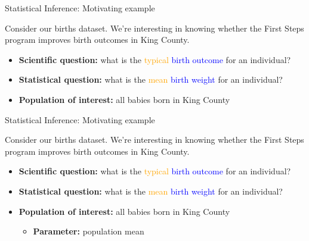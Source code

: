 \documentclass[10pt,t]{beamer}
\begin{document}
\begin{frame}{Statistical Inference: Motivating example}

Consider our births dataset. We're interesting in knowing whether the First Steps program improves birth outcomes in King County.

\vspace{0.1cm}

\begin{itemize}
	\item \textbf{Scientific question:} what is the \textcolor{orange}{typical}  \textcolor{blue}{birth outcome} for an individual?
	\item \textbf{Statistical question:} what is the \textcolor{orange}{mean} \textcolor{blue}{birth weight} for an individual?
	\item \textbf{Population of interest:} all babies born in King County
\end{itemize}

\end{frame}

\begin{frame}{Statistical Inference: Motivating example}

Consider our births dataset. We're interesting in knowing whether the First Steps program improves birth outcomes in King County.

\vspace{0.1cm}

\begin{itemize}
	\item \textbf{Scientific question:} what is the \textcolor{orange}{typical}  \textcolor{blue}{birth outcome} for an individual?
	\item \textbf{Statistical question:} what is the \textcolor{orange}{mean} \textcolor{blue}{birth weight} for an individual?
	\item \textbf{Population of interest:} all babies born in King County
	\begin{itemize}
		\item \textbf{Parameter:} population mean
	\end{itemize}
\end{itemize}

\end{frame}
\end{document}
